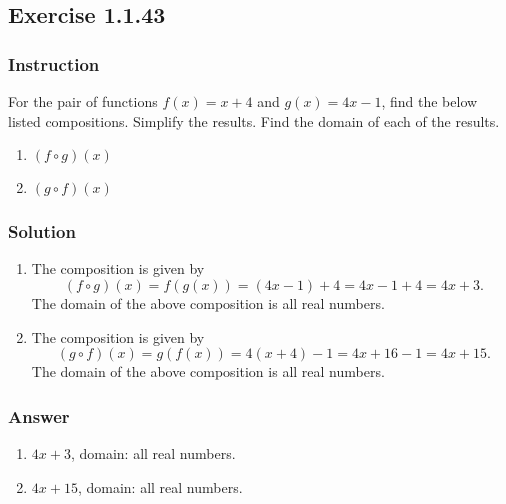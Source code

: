 \subsection*{Exercise 1.1.43}

\subsubsection*{Instruction}

For the pair of functions $ f(x) = x + 4 $ and $ g(x) = 4x - 1 $, find the below listed compositions. Simplify the results. Find the domain of each of the results.

\begin{enumerate}[label = (\alph*)]
  \item $ (f \circ g)(x) $
  \item $ (g \circ f)(x) $
\end{enumerate}

\subsubsection*{Solution}

\begin{enumerate}[label = (\alph*)]
  \item
    The composition is given by
    $$ \phantom{.}
    (f \circ g)(x) = f(g(x)) = (4x - 1) + 4 = 4x - 1 + 4 = 4x + 3
    .$$
    The domain of the above composition is all real numbers.
  \item
    The composition is given by
    $$ \phantom{.}
    (g \circ f)(x) = g(f(x)) = 4(x + 4) -1 = 4x + 16 - 1 = 4x + 15
    .$$
    The domain of the above composition is all real numbers.
\end{enumerate}

\subsubsection*{Answer}

\begin{enumerate}[label = (\alph*)]
  \item
    $ 4x + 3 $, domain: all real numbers.
  \item
    $ 4x + 15 $, domain: all real numbers.
\end{enumerate}
